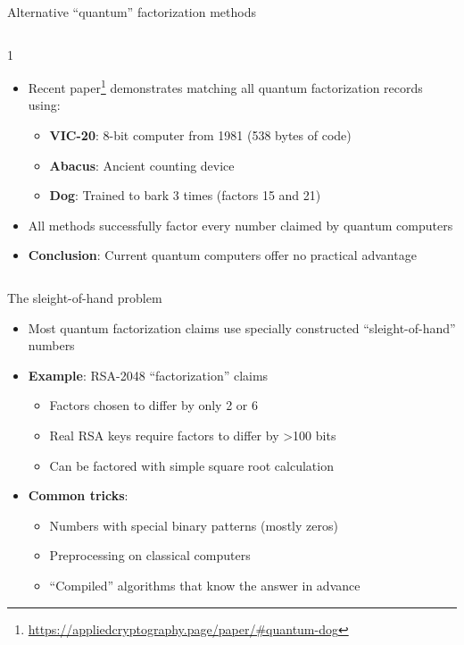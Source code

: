\documentclass[aspectratio=169, lualatex]{beamer} %
\begin{document}
\begin{frame}{Alternative ``quantum'' factorization methods}
	\begin{columns}[c]
		\begin{column}{1\textwidth}
			\begin{itemize}
				\item Recent paper\footnote{\url{https://appliedcryptography.page/paper/\#quantum-dog}} demonstrates matching all quantum factorization records using:
				      \begin{itemize}
					      \item \textbf{VIC-20}: 8-bit computer from 1981 (538 bytes of code)
					      \item \textbf{Abacus}: Ancient counting device
					      \item \textbf{Dog}: Trained to bark 3 times (factors 15 and 21)
				      \end{itemize}
				\item All methods successfully factor every number claimed by quantum computers
				\item \textbf{Conclusion}: Current quantum computers offer no practical advantage
			\end{itemize}
		\end{column}
	\end{columns}
\end{frame}

\iffalse
\begin{frame}{The sleight-of-hand problem}
	\begin{itemize}
		\item Most quantum factorization claims use specially constructed ``sleight-of-hand'' numbers
		\item \textbf{Example}: RSA-2048 ``factorization'' claims
		      \begin{itemize}
			      \item Factors chosen to differ by only 2 or 6
			      \item Real RSA keys require factors to differ by >100 bits
			      \item Can be factored with simple square root calculation
		      \end{itemize}
		\item \textbf{Common tricks}:
		      \begin{itemize}
			      \item Numbers with special binary patterns (mostly zeros)
			      \item Preprocessing on classical computers
			      \item ``Compiled'' algorithms that know the answer in advance
		      \end{itemize}
	\end{itemize}
\end{frame}
\end{document}
